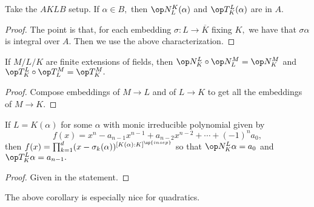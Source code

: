\documentclass[../notes.tex]{subfiles}
\begin{document}
\begin{prop}
    Take the $AKLB$ setup. If $\alpha\in B,$ then $\op N_L^K(\alpha)$ and $\op T_K^L(\alpha)$ are in $A.$
\end{prop}
\begin{proof}
    The point is that, for each embedding $\sigma:L\to\overline K$ fixing $K,$ we have that $\sigma\alpha$ is integral over $A.$ Then we use the above characterization.
\end{proof}
\begin{cor}
    If $M/L/K$ are finite extensions of fields, then $\op N_K^L\circ\op N^M_L=\op N^M_K$ and $\op T^L_K\circ\op T^M_L=\op T^M_K.$
\end{cor}
\begin{proof}
    Compose embeddings of $M\to L$ and of $L\to K$ to get all the embeddings of $M\to K.$
\end{proof}
\begin{cor}
    If $L=K(\alpha)$ for some $\alpha$ with monic irreducible polynomial given by
    \[f(x)=x^n-a_{n-1}x^{n-1}+a_{n-2}x^{n-2}+\cdots+(-1)^na_0,\]
    then $f(x)=\prod_{k=1}^d(x-\sigma_k(\alpha))^{[K(\alpha):K]^{\op{insep}}}$ so that $\op N^L_K\alpha=a_0$ and $\op T_K^L\alpha=a_{n-1}.$
\end{cor}
\begin{proof}
    Given in the statement.
\end{proof}
The above corollary is especially nice for quadratics.
\end{document}
